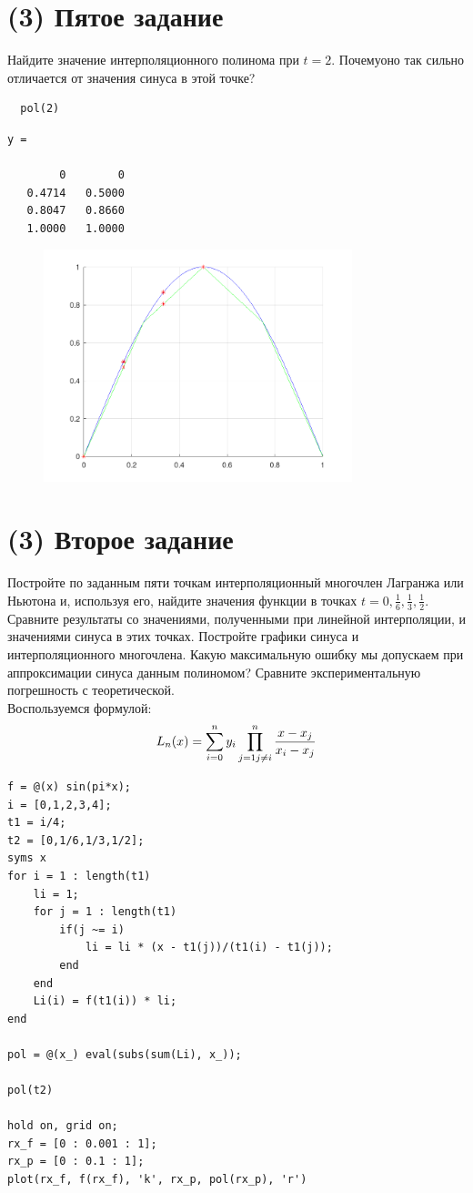 \section{(3) Пятое задание}
Найдите значение интерполяционного полинома при $t = 2$. Почемуоно так сильно отличается от значения синуса в этой точке?\\[2mm]
\begin{lstlisting}
  pol(2)
\end{lstlisting}
\begin{lstlisting}[backgroundcolor=\color{cyan}]
  y =

        0        0
   0.4714   0.5000
   0.8047   0.8660
   1.0000   1.0000
 \end{lstlisting}

\begin{figure}[h]
  \centering
  \includegraphics[width=0.8\textwidth]{images/first_task_1.png}
\end{figure}

\section{(3) Второе задание}
Постройте по заданным пяти точкам интерполяционный многочлен Лагранжа или Ньютона и, используя его, найдите значения функции в точках $t =0, \frac{1}{6}, \frac{1}{3}, \frac{1}{2}$. Сравните результаты со значениями, полученными при линейной интерполяции, и значениями синуса в этих точках. Постройте графики синуса и интерполяционного многочлена. Какую максимальную ошибку мы допускаем при аппроксимации синуса данным полиномом? Сравните экспериментальную погрешность с теоретической.\\[2mm]

Воспользуемся формулой:
\[
  L_{n}(x) = \sum_{i=0}^{n}y_{i}\prod_{j=1\\j \neq i}^{n}\frac{x-x_{j}}{x_{i}-x_{j}}
\]
\begin{lstlisting}
f = @(x) sin(pi*x);
i = [0,1,2,3,4];
t1 = i/4;
t2 = [0,1/6,1/3,1/2];
syms x
for i = 1 : length(t1)
	li = 1;
	for j = 1 : length(t1)
		if(j ~= i)
			li = li * (x - t1(j))/(t1(i) - t1(j));
		end
	end
	Li(i) = f(t1(i)) * li;
end

pol = @(x_) eval(subs(sum(Li), x_));

pol(t2)

hold on, grid on;
rx_f = [0 : 0.001 : 1];
rx_p = [0 : 0.1 : 1];
plot(rx_f, f(rx_f), 'k', rx_p, pol(rx_p), 'r')
\end{lstlisting}

